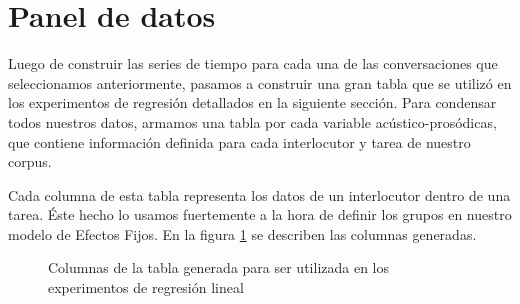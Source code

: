 \section{Panel de datos}
\label{sec:panel_data}

Luego de construir las series de tiempo para cada una de las conversaciones que seleccionamos anteriormente, pasamos a construir una gran tabla que se utilizó en los experimentos de regresión detallados en la siguiente sección. Para condensar todos nuestros datos, armamos una tabla por cada variable acústico-prosódicas, que contiene información definida para cada interlocutor y tarea de nuestro corpus.

Cada columna de esta tabla representa los datos de un interlocutor dentro de una tarea. Éste hecho lo usamos fuertemente a la hora de definir los grupos en nuestro modelo de Efectos Fijos. En la figura \ref{fig:panel_data} se describen las columnas generadas.

\begin{figure}[b!]
\centering
{}
\label{fig:panel_data}
\caption{Columnas de la tabla generada para ser utilizada en los experimentos de regresión lineal}
\end{figure}



